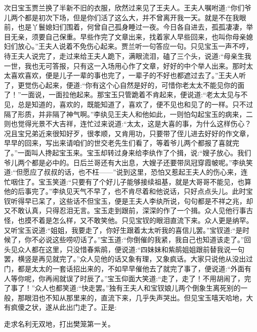 \begin{parag}
    次日宝玉贾兰换了半新不旧的衣服，欣然过来见了王夫人。王夫人嘱咐道:“你们爷儿两个都是初次下场，但是你们活了这么大，并不曾离开我一天。就是不在我眼前，也是丫鬟媳妇们围着，何曾自己孤身睡过一夜。今日各自进去，孤孤凄凄，举目无亲，须要自己保重。早些作完了文章出来，找着家人早些回来，也叫你母亲媳妇们放心。”王夫人说着不免伤心起来。贾兰听一句答应一句。只见宝玉一声不哼，待王夫人说完了，走过来给王夫人跪下，满眼流泪，磕了三个头，说道:“母亲生我一世，我也无可答报，只有这一入场用心作了文章，好好的中个举人出来。那时太太喜欢喜欢，便是儿子一辈的事也完了，一辈子的不好也都遮过去了。”王夫人听了，更觉伤心起来，便道:“你有这个心自然是好的，可惜你老太太不能见你的面了！”一面说，一面拉他起来。那宝玉只管跪着不肯起来，便说道:“老太太见与不见，总是知道的，喜欢的，既能知道了，喜欢了，便不见也和见了的一样。只不过隔了形质，并非隔了神气啊。”李纨见王夫人和他如此，一则怕勾起宝玉的病来，二则也觉得光景不大吉祥，连忙过来说道:“太太，这是大喜的事，为什么这样伤心？况且宝兄弟近来很知好歹，很孝顺，又肯用功，只要带了侄儿进去好好的作文章，早早的回来，写出来请咱们的世交老先生们看了，等着爷儿两个都报了喜就完了。”一面叫人搀起宝玉来。宝玉却转过身来给李纨作了个揖，说:“嫂子放心。我们爷儿两个都是必中的。日后兰哥还有大出息，大嫂子还要带凤冠穿霞帔呢。”李纨笑道:“但愿应了叔叔的话，也不枉——”说到这里，恐怕又惹起王夫人的伤心来，连忙咽住了。宝玉笑道:“只要有了个好儿子能够接续祖基，就是大哥哥不能见，也算他的后事完了。”李纨见天气不早了，也不肯尽着和他说话，只好点点头儿。此时宝钗听得早已呆了，这些话不但宝玉，便是王夫人李纨所说，句句都是不祥之兆，却又不敢认真，只得忍泪无言。宝玉走到跟前，深深的作了一个揖。众人见他行事古怪，也摸不着是怎么样，又不敢笑他。只见宝钗的眼泪直流下来。众人更是纳罕。又听宝玉说道:“姐姐，我要走了，你好生跟着太太听我的喜信儿罢。”宝钗道:“是时候了，你不必说这些唠叨话了。”宝玉道:“你倒催的我紧，我自己也知道该走了。”回头见众人都在这里，只没惜春紫鹃，便说道:“四妹妹和紫鹃姐姐跟前替我说一句罢，横竖是再见就完了。”众人见他的话又象有理，又象疯话。大家只说他从没出过门，都是太太的一套话招出来的，不如早早催他去了就完了事了，便说道:“外面有人等你呢，你再闹就误了时辰了。”宝玉仰面大笑道:“走了，走了！不用胡闹了，完了事了！”众人也都笑道:“快走罢。”独有王夫人和宝钗娘儿两个倒象生离死别的一般，那眼泪也不知从那里来的，直流下来，几乎失声哭出。但见宝玉嘻天哈地，大有疯傻之状，遂从此出门走了。正是:
\end{parag}


\begin{poem}
    \begin{pl}
        走求名利无双地，打出樊笼第一关。
    \end{pl}
\end{poem}


